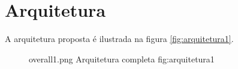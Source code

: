 \chapter{Arquitetura}
\label{arq-sec:arquitetura}

A arquitetura proposta é ilustrada na figura \ref{fig:arquitetura1}.
\begin{figure}[h!]
    {overall1.png}
    {Arquitetura completa}
    {fig:arquitetura1}
\end{figure}
